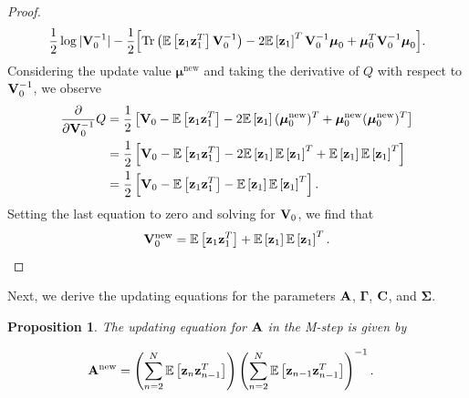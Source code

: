 \documentclass[12pt, oneside]{book}
\numberwithin{equation}{section}
\newcommand{\expectation}[1]{\mathbb{E}\left[#1\right]}
\newcommand{\z}{{\bf z}}
\newtheorem{proposition}{Proposition}[section]
\begin{document}
{\begin{proof}
\begin{equation}
	\frac{1}{2}\log \vert
	  {\bf V}_0^{-1}\vert -\frac{1}{2}\Big[\text{Tr}\left(\mathbb{E}\left[\z_1 \z_1^T\right] {\bf V}_0^{-1}\right) -2 \mathbb{E}\left[\z_1\right]^T{\bf V}_0^{-1}\boldsymbol\mu_0 + \boldsymbol\mu_0^T {\bf V}_0^{-1}\boldsymbol\mu_0\Big].
\end{equation}
Considering the update value $\boldsymbol{\mu}^\text{new}$ and taking the derivative of $Q$ with respect to ${\bf V}_0^{-1}$, we observe
\begin{align}
	\frac{\partial}{\partial {\bf V}_0^{-1}} Q &= \frac{1}{2}\left[{\bf V}_0 - \expectation{\z_1 \z_1^T} - 2\expectation{\z_1} (\boldsymbol{\mu}_0^\text{new})^T + \boldsymbol{\mu}_0^\text{new} (\boldsymbol{\mu}_0^\text{new})^T \right] \nonumber \\
	&= \frac{1}{2} \left[{\bf V}_0 - \expectation{\z_1 \z_1^T} - 2\expectation{\z_1}\expectation{\z_1}^T + \expectation{\z_1}\expectation{\z_1}^T \right] \nonumber \\
	&= \frac{1}{2}\left[{\bf V}_0 - \expectation{\z_1 \z_1^T} - \expectation{\z_1}\expectation{\z_1}^T\right].
\end{align}
Setting the last equation to zero and solving for ${\bf V}_0$, we find that
\begin{equation}
	{\bf V}_0^\text{new} = \expectation{\z_1 \z_1^T} + \expectation{\z_1}\expectation{\z_1}^T.
\end{equation}
\end{proof}

Next, we derive the updating equations for the parameters $\bf A$, $\boldsymbol{\Gamma}$, $\bf C$, and $\boldsymbol{\Sigma}$.
\begin{proposition}
	The updating equation for $\bf A$ in the M-step is given by
	
	\begin{align}
		{\bf A}^{\text{\normalfont new}} &= \left(\sum_{n=2}^N \expectation{\z_n \z_{n-1}^T}\right)\left(\sum_{n=2}^N \expectation{\z_{n-1}\z_{n-1}^T}\right)^{-1} \label{eq:mstep-A}.
	\end{align}
\end{proposition}

}
\end{document}
